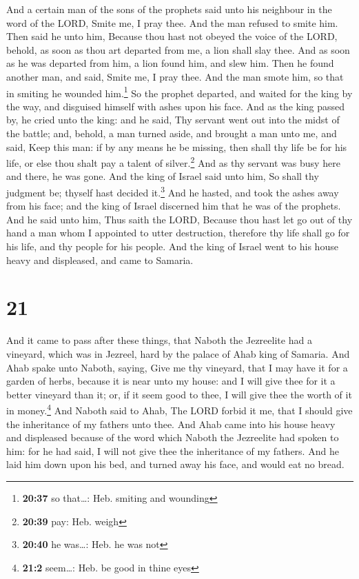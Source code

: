  And a certain man of the sons of the prophets said unto
his neighbour in the word of the LORD, Smite me, I pray thee. And the
man refused to smite him.  Then said he unto him, Because
thou hast not obeyed the voice of the LORD, behold, as soon as thou art
departed from me, a lion shall slay thee. And as soon as he was departed
from him, a lion found him, and slew him.  Then he found
another man, and said, Smite me, I pray thee. And the man smote him, so
that in smiting he wounded him.\footnote{\textbf{20:37} so that\ldots:
  Heb. smiting and wounding}  So the prophet departed,
and waited for the king by the way, and disguised himself with ashes
upon his face.  And as the king passed by, he cried unto
the king: and he said, Thy servant went out into the midst of the
battle; and, behold, a man turned aside, and brought a man unto me, and
said, Keep this man: if by any means he be missing, then shall thy life
be for his life, or else thou shalt pay a talent of silver.\footnote{\textbf{20:39}
  pay: Heb. weigh}  And as thy servant was busy here and
there, he was gone. And the king of Israel said unto him, So shall thy
judgment be; thyself hast decided it.\footnote{\textbf{20:40} he
  was\ldots: Heb. he was not}  And he hasted, and took
the ashes away from his face; and the king of Israel discerned him that
he was of the prophets.  And he said unto him, Thus saith
the LORD, Because thou hast let go out of thy hand a man whom I
appointed to utter destruction, therefore thy life shall go for his
life, and thy people for his people.  And the king of
Israel went to his house heavy and displeased, and came to Samaria.

\hypertarget{section-20}{%
\section{21}\label{section-20}}

 And it came to pass after these things, that Naboth the
Jezreelite had a vineyard, which was in Jezreel, hard by the palace of
Ahab king of Samaria.  And Ahab spake unto Naboth, saying,
Give me thy vineyard, that I may have it for a garden of herbs, because
it is near unto my house: and I will give thee for it a better vineyard
than it; or, if it seem good to thee, I will give thee the worth of it
in money.\footnote{\textbf{21:2} seem\ldots: Heb. be good in thine eyes}
 And Naboth said to Ahab, The LORD forbid it me, that I
should give the inheritance of my fathers unto thee.  And
Ahab came into his house heavy and displeased because of the word which
Naboth the Jezreelite had spoken to him: for he had said, I will not
give thee the inheritance of my fathers. And he laid him down upon his
bed, and turned away his face, and would eat no bread.

